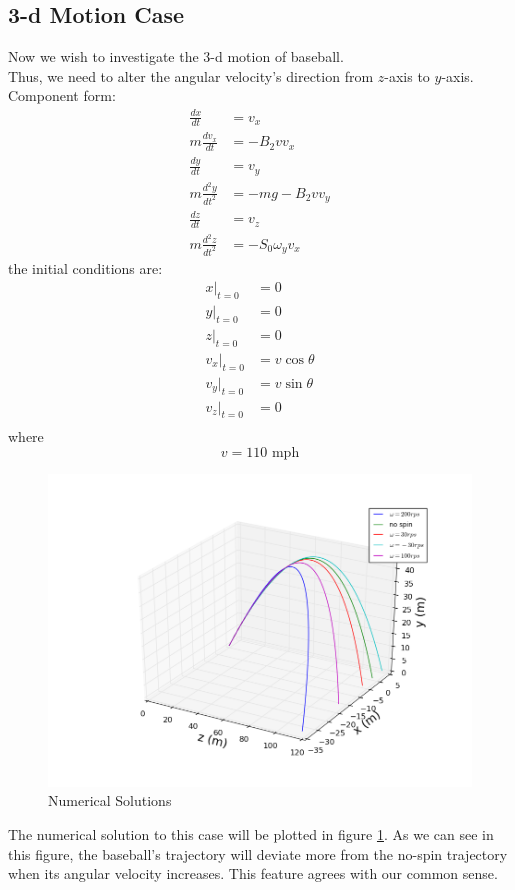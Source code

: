 \documentclass[10pt,a4paper]{article}
\begin{document}
   \subsection{3-d Motion Case}
   Now we wish to investigate the 3-d motion of baseball.\\
   Thus, we need to alter the angular velocity's direction from $z$-axis to $y$-axis.\\
   Component form:
   \begin{align}
   \frac{dx}{dt}&=v_x\\
   m\frac{dv_x}{dt}&=-B_{2}vv_x\\
   \frac{dy}{dt}&=v_y\\
   m\frac{d^{2}y}{dt^{2}}&=-mg-B_{2}vv_y\\
   \frac{dz}{dt}&=v_z\\
   m\frac{d^{2}z}{dt^{2}}&=-S_0\omega_yv_x
   \end{align}
   the initial conditions are:
   \begin{align}
   x|_{t=0}&=0\\
   y|_{t=0}&=0\\
   z|_{t=0}&=0\\
   v_x|_{t=0}&=v\cos{\theta}\\
   v_y|_{t=0}&=v\sin{\theta}\\
   v_z|_{t=0}&=0\\
   \end{align}
   where
   \begin{equation}
   v=110\text{ mph}
   \end{equation}
   
    \begin{figure}[htbp]
    	\centering
    	\includegraphics[width=5in]{baseball_2.png}
    	\caption{Numerical Solutions\label{Figure_2}}
    \end{figure}
     The numerical solution to this case will be plotted in figure \ref{Figure_2}.
    As we can see in this figure, the baseball's trajectory will deviate more from the no-spin trajectory when its angular velocity increases. This feature agrees with our common sense.
    
\end{document}
